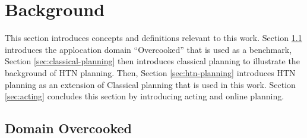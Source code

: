\section{Background}\label{sec:background}

This section introduces concepts and definitions relevant to this work.
Section \ref{sec:background-domain} introduces the applocation domain ``Overcooked'' that is used as a benchmark,
Section \ref{sec:classical-planning} then introduces classical planning to illustrate the background of HTN planning.
Then, Section \ref{sec:htn-planning} introduces HTN planning as an extension of Classical planning that is used in this work.
Section \ref{sec:acting} concludes this section by introducing acting and online planning.


\subsection{Domain Overcooked}\label{sec:background-domain}


